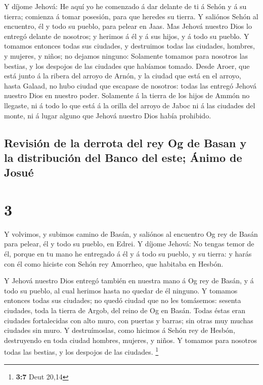  Y díjome Jehová: He aquí yo he comenzado á dar delante
de ti á Sehón y á su tierra; comienza á tomar posesión, para que heredes
su tierra.  Y saliónos Sehón al encuentro, él y todo su
pueblo, para pelear en Jaas.  Mas Jehová nuestro Dios lo
entregó delante de nosotros; y herimos á él y á sus hijos, y á todo su
pueblo.  Y tomamos entonces todas sus ciudades, y
destruimos todas las ciudades, hombres, y mujeres, y niños; no dejamos
ninguno:  Solamente tomamos para nosotros las bestias, y
los despojos de las ciudades que habíamos tomado.  Desde
Aroer, que está junto á la ribera del arroyo de Arnón, y la ciudad que
está en el arroyo, hasta Galaad, no hubo ciudad que escapase de
nosotros: todas las entregó Jehová nuestro Dios en nuestro poder.
 Solamente á la tierra de los hijos de Ammón no llegaste,
ni á todo lo que está á la orilla del arroyo de Jaboc ni á las ciudades
del monte, ni á lugar alguno que Jehová nuestro Dios había prohibido.

\hypertarget{revisiuxf3n-de-la-derrota-del-rey-og-de-basan-y-la-distribuciuxf3n-del-banco-del-este-uxe1nimo-de-josuuxe9}{%
\subsection{Revisión de la derrota del rey Og de Basan y la distribución
del Banco del este; Ánimo de
Josué}\label{revisiuxf3n-de-la-derrota-del-rey-og-de-basan-y-la-distribuciuxf3n-del-banco-del-este-uxe1nimo-de-josuuxe9}}

\hypertarget{section-2}{%
\section{3}\label{section-2}}

 Y volvimos, y subimos camino de Basán, y saliónos al
encuentro Og rey de Basán para pelear, él y todo su pueblo, en Edrei.
 Y díjome Jehová: No tengas temor de él, porque en tu mano
he entregado á él y á todo su pueblo, y su tierra: y harás con él como
hiciste con Sehón rey Amorrheo, que habitaba en Hesbón.

 Y Jehová nuestro Dios entregó también en nuestra mano á
Og rey de Basán, y á todo su pueblo, al cual herimos hasta no quedar de
él ninguno.  Y tomamos entonces todas sus ciudades; no
quedó ciudad que no les tomásemos: sesenta ciudades, toda la tierra de
Argob, del reino de Og en Basán.  Todas éstas eran
ciudades fortalecidas con alto muro, con puertas y barras; sin otras muy
muchas ciudades sin muro.  Y destruímoslas, como hicimos á
Sehón rey de Hesbón, destruyendo en toda ciudad hombres, mujeres, y
niños.  Y tomamos para nosotros todas las bestias, y los
despojos de las ciudades. \footnote{\textbf{3:7} Deut 20,14}


